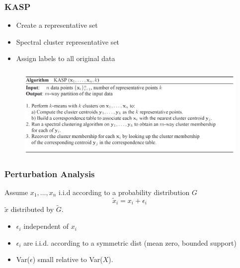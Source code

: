 \documentclass{beamer}
\begin{document}
\begin{frame}
\frametitle{KASP}
  \begin{itemize}
  \item Create a representative set
    \item Spectral cluster representative set 
      \item Assign labels to all original data
  \end{itemize}




\end{frame}


\begin{frame}
\frametitle{}
\begin{figure}[h]
  \centering
  \includegraphics[width = 13cm]{kasp_algo}
\end{figure}
\end{frame}


\begin{frame}
\frametitle{Perturbation Analysis}
Assume $x_1, \ldots, x_n$ i.i.d according to a probability distribution $G$
\begin{equation}
  \label{eq:pert}
  \tilde{x}_i = x_i + \epsilon_i
\end{equation}
$\tilde{x}$ distributed by $\tilde{G}$. 

\begin{itemize}
\item $\epsilon_i$ independent of $x_i$
\item $\epsilon_i$ are i.i.d. according to a symmetric dist (mean zero, bounded support) 
\item Var($\epsilon$) small relative to Var($X$). 
\end{itemize}


\end{frame}
\end{document}
